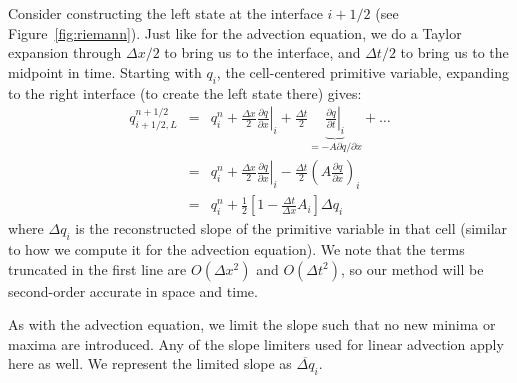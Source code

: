 Consider constructing the left state at the interface $i+1/2$ (see
Figure~\ref{fig:riemann}).  Just like for the advection equation, we
do a Taylor expansion through $\Delta x/2$ to bring us to the
interface, and $\Delta t/2$ to bring us to the midpoint in time.
Starting with $q_i$, the cell-centered primitive variable, expanding
to the right interface (to create the left state there) gives:
\begin{eqnarray}
q_{i+1/2,L}^{n+1/2} &=& q_i^n + 
    \left . \frac{\Delta x}{2} \frac{\partial q}{\partial x} \right |_i +
    \frac{\Delta t}{2} \underbrace{\left .\frac{\partial q}{\partial t} \right |_i}_{= -A \partial q / \partial x} + \ldots \\
&=& q_i^n + \frac{\Delta x}{2} \left . \frac{\partial q}{\partial x} \right |_i
          - \frac{\Delta t}{2} \left ( A \frac{\partial q}{\partial x} \right )_i\\
&=& q_i^n + \frac{1}{2} \left [ 1 - \frac{\Delta t}{\Delta x} A_i \right ] \Delta q_i \label{eq:taylorstate}
\end{eqnarray}
where $\Delta q_i$ is the reconstructed slope of the primitive
variable in that cell (similar to how we compute it for the advection
equation).  We note that the terms truncated in the first line are
$O(\Delta x^2)$ and $O(\Delta t^2)$, so our method will be second-order
accurate in space and time.

As with the advection equation, we limit the slope such that no new minima
or maxima are introduced.  Any of the slope limiters used for linear advection
apply here as well.  We represent the limited slope as $\overline{\Delta q}_i$.

